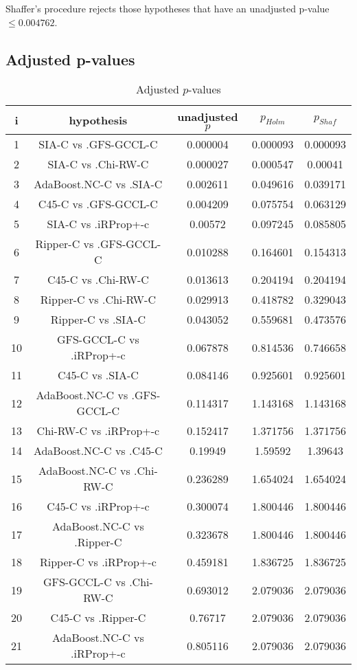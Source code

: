 \documentclass[a4paper,10pt]{article}
\begin{document}
\begin{landscape}
Shaffer's procedure rejects those hypotheses that have an unadjusted p-value $\le0.004762$.

\pagebreak

\subsection{Adjusted p-values}

\begin{table}[!htp]
\centering\scriptsize
\begin{tabular}{ccccc}
i&hypothesis&unadjusted $p$&$p_{Holm}$&$p_{Shaf}$\\
\hline1&SIA-C vs .GFS-GCCL-C&0.000004&0.000093&0.000093\\
2&SIA-C vs .Chi-RW-C&0.000027&0.000547&0.00041\\
3&AdaBoost.NC-C vs .SIA-C&0.002611&0.049616&0.039171\\
4&C45-C vs .GFS-GCCL-C&0.004209&0.075754&0.063129\\
5&SIA-C vs .iRProp+-c&0.00572&0.097245&0.085805\\
6&Ripper-C vs .GFS-GCCL-C&0.010288&0.164601&0.154313\\
7&C45-C vs .Chi-RW-C&0.013613&0.204194&0.204194\\
8&Ripper-C vs .Chi-RW-C&0.029913&0.418782&0.329043\\
9&Ripper-C vs .SIA-C&0.043052&0.559681&0.473576\\
10&GFS-GCCL-C vs .iRProp+-c&0.067878&0.814536&0.746658\\
11&C45-C vs .SIA-C&0.084146&0.925601&0.925601\\
12&AdaBoost.NC-C vs .GFS-GCCL-C&0.114317&1.143168&1.143168\\
13&Chi-RW-C vs .iRProp+-c&0.152417&1.371756&1.371756\\
14&AdaBoost.NC-C vs .C45-C&0.19949&1.59592&1.39643\\
15&AdaBoost.NC-C vs .Chi-RW-C&0.236289&1.654024&1.654024\\
16&C45-C vs .iRProp+-c&0.300074&1.800446&1.800446\\
17&AdaBoost.NC-C vs .Ripper-C&0.323678&1.800446&1.800446\\
18&Ripper-C vs .iRProp+-c&0.459181&1.836725&1.836725\\
19&GFS-GCCL-C vs .Chi-RW-C&0.693012&2.079036&2.079036\\
20&C45-C vs .Ripper-C&0.76717&2.079036&2.079036\\
21&AdaBoost.NC-C vs .iRProp+-c&0.805116&2.079036&2.079036\\
\hline
\end{tabular}
\caption{Adjusted $p$-values}
\end{table}

\end{landscape}
\end{document}
